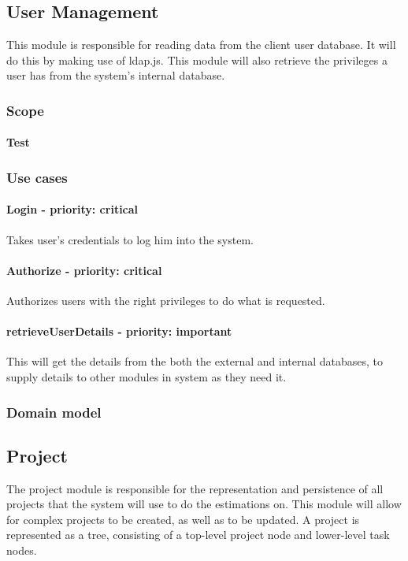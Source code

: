 \subsection{User Management}
This module is responsible for reading data from the client user database. It will do this by making use of ldap.js. This module will also retrieve the privileges a user has from the system's internal database.

\subsubsection{Scope}
\paragraph{Test}
\subsubsection{Use cases}

\paragraph{Login - priority: critical}
Takes user's credentials to log him into the system.

\paragraph{Authorize - priority: critical}
Authorizes users with the right privileges to do what is requested.

\paragraph{retrieveUserDetails - priority: important}
This will get the details from the both the external and internal databases, to supply details to other modules in system as they need it.

\subsubsection{Domain model}

\subsection{Project}
The project module is responsible for the representation and persistence of all projects that the system will use to do the estimations on. This module will allow for complex projects to be created, as well as to be updated. A project is represented as a tree, consisting of a top-level project node and lower-level task nodes.


